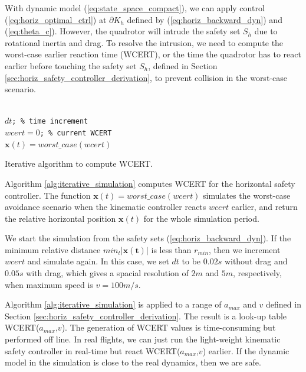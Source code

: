 \documentclass[journal,11pt,onecolumn,draftclsnofoot,]{IEEEtran}
\begin{document}
With dynamic model (\ref{eq:state_space_compact}), we can apply control (\ref{eq:horiz_optimal_ctrl}) at $\partial K_h$ defined by (\ref{eq:horiz_backward_dyn}) and (\ref{eq:theta_c}). However, the quadrotor will intrude the safety set $S_h$ due to rotational inertia and drag. To resolve the intrusion, we need to compute the worst-case earlier reaction time (WCERT), or the time the quadrotor has to react earlier before touching the safety set $S_h$, defined in Section \ref{sec:horiz_safety_controller_derivation}, to prevent collision in the worst-case scenario.

\begin{algorithm}
	\texttt{\\
		$dt$;	\hspace{3.2cm}\% time increment \\
		$wcert = 0$;	\hspace{2cm}\% current WCERT \\
		$ \boldsymbol{x}(t) = worst\_case(wcert) $\;
	}
	\caption{Iterative algorithm to compute WCERT.}
	\label{alg:iterative_simulation}
\end{algorithm}

Algorithm \ref{alg:iterative_simulation} computes WCERT for the horizontal safety controller. The function $ \boldsymbol{x}(t) = worst\_case(wcert) $ simulates the worst-case avoidance scenario when the kinematic controller reacts $wcert$ earlier, and return the relative horizontal position $\boldsymbol{x}(t)$ for the whole simulation period. 

We start the simulation from the safety sets (\ref{eq:horiz_backward_dyn}). If the minimum relative distance $ min_t|\boldsymbol{x(t)}|$ is less than $r_{min}$, then we increment $wcert$ and simulate again. In this case, we set $dt$ to be $0.02s$ without drag and $0.05s$ with drag, which gives a spacial resolution of $2 m$ and $5m$, respectively, when maximum speed is $v=100m/s$. 

Algorithm \ref{alg:iterative_simulation} is applied to a range of $a_{max}$ and $v$ defined in Section \ref{sec:horiz_safety_controller_derivation}. The result is a look-up table WCERT($a_{max}$,$v$). The generation of WCERT values is time-consuming but performed off line. In real flights, we can just run the light-weight kinematic safety controller in real-time but react WCERT($a_{max}$,$v$) earlier. If the dynamic model in the simulation is close to the real dynamics, then we are safe.
\end{document}
